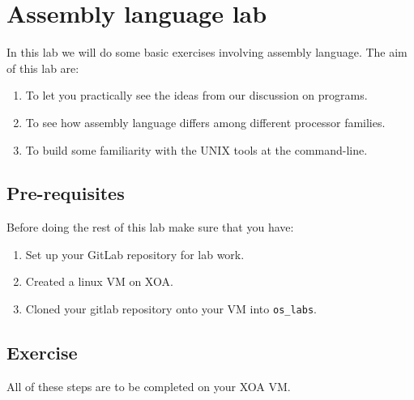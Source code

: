 \chapter{Assembly language lab}
\label{ch:assembly-language-lab}

In this lab we will do some basic exercises involving assembly language.
The aim of this lab are:
\begin{enumerate}
\item To let you practically see the ideas from our discussion on programs.
\item To see how assembly language differs among different processor families.
\item To build some familiarity with the UNIX tools at the command-line.
\end{enumerate}

\section{Pre-requisites}

Before doing the rest of this lab make sure that you have:
\begin{enumerate}
\item Set up your GitLab repository for lab work.
\item Created a linux VM on XOA.
\item Cloned your gitlab repository onto your VM into \texttt{os\_labs}.
\end{enumerate}

\section{Exercise}

All of these steps are to be completed on your XOA VM.

